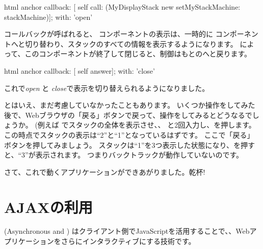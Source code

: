 \documentclass[a4paper,10pt,twoside]{book}
\begin{document}
\begin{code}{}
html anchor
	callback: [ self call: (MyDisplayStack new setMyStackMachine: stackMachine)];
	with: 'open'
\end{code}


コールバックが呼ばれると、 コンポーネントの表示は、一時的に コンポーネントへと切り替わり、スタックのすべての情報を表示するようになります。
によって、このコンポーネントが終了して閉じると、制御はもとのへと戻ります。


\begin{code}{}
html anchor
	callback: [ self answer];
	with: 'close'
\end{code}

これで\emph{open} と \emph{close}で表示を切り替えられるようになりました。

とはいえ、まだ考慮していなかったこともあります。
いくつか操作をしてみた後で、Webブラウザの「戻る」ボタンで戻って、操作をしてみるとどうなるでしょうか。
(例えば でスタックの全体を表示させ、、 と2回入力し、\menu {+}を押します。
この時点でスタックの表示は``2''と``1''となっているはずです。
ここで「戻る」ボタンを押してみましょう。
スタックは``1''を3つ表示した状態になり、\menu {+}を押すと、``3''が表示されます。
つまりバックトラックが動作していないのです。


さて、これで動くアプリケーションができあがりました。乾杯!

\section{AJAXの利用}


 (Asynchronous  and ) はクライアント側でJavaScriptを活用することで、、Webアプリケーションをさらにインタラクティブにする技術です。
\end{document}
